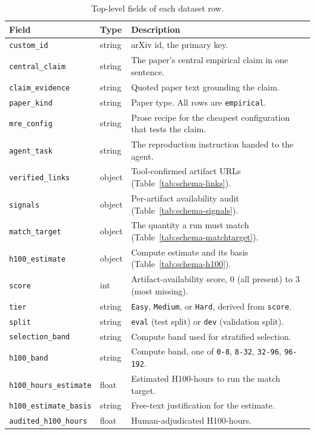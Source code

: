 \begin{table}[t]
\caption{Top-level fields of each dataset row.}
\label{tab:schema-toplevel}
\begin{center}
\small
\begin{tabular}{@{}lll@{}}
\toprule
Field & Type & Description \\
\midrule
\texttt{custom\_id} & string & arXiv id, the primary key. \\
\texttt{central\_claim} & string & The paper's central empirical claim in one sentence. \\
\texttt{claim\_evidence} & string & Quoted paper text grounding the claim. \\
\texttt{paper\_kind} & string & Paper type. All rows are \texttt{empirical}. \\
\texttt{mre\_config} & string & Prose recipe for the cheapest configuration that tests the claim. \\
\texttt{agent\_task} & string & The reproduction instruction handed to the agent. \\
\texttt{verified\_links} & object & Tool-confirmed artifact URLs (Table~\ref{tab:schema-links}). \\
\texttt{signals} & object & Per-artifact availability audit (Table~\ref{tab:schema-signals}). \\
\texttt{match\_target} & object & The quantity a run must match (Table~\ref{tab:schema-matchtarget}). \\
\texttt{h100\_estimate} & object & Compute estimate and its basis (Table~\ref{tab:schema-h100}). \\
\texttt{score} & int & Artifact-availability score, 0 (all present) to 3 (most missing). \\
\texttt{tier} & string & \texttt{Easy}, \texttt{Medium}, or \texttt{Hard}, derived from \texttt{score}. \\
\texttt{split} & string & \texttt{eval} (test split) or \texttt{dev} (validation split). \\
\texttt{selection\_band} & string & Compute band used for stratified selection. \\
\texttt{h100\_band} & string & Compute band, one of \texttt{0-8}, \texttt{8-32}, \texttt{32-96}, \texttt{96-192}. \\
\texttt{h100\_hours\_estimate} & float & Estimated H100-hours to run the match target. \\
\texttt{h100\_estimate\_basis} & string & Free-text justification for the estimate. \\
\texttt{audited\_h100\_hours} & float & Human-adjudicated H100-hours. \\

\end{tabular}
\end{center}
\end{table}
